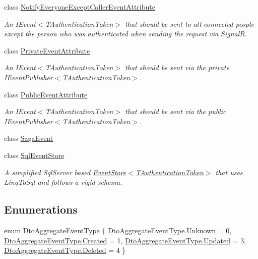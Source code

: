 \begin{DoxyCompactItemize}
class \hyperlink{classCqrs_1_1Events_1_1NotifyEveryoneExceptCallerEventAttribute}{Notify\+Everyone\+Except\+Caller\+Event\+Attribute}
\begin{DoxyCompactList}\small\item\em An I\+Event$<$\+T\+Authentication\+Token$>$ that should be sent to all connected people except the person who was authenticated when sending the request via SignalR. \end{DoxyCompactList}\item 
class \hyperlink{classCqrs_1_1Events_1_1PrivateEventAttribute}{Private\+Event\+Attribute}
\begin{DoxyCompactList}\small\item\em An I\+Event$<$\+T\+Authentication\+Token$>$ that should be sent via the private I\+Event\+Publisher$<$\+T\+Authentication\+Token$>$. \end{DoxyCompactList}\item 
class \hyperlink{classCqrs_1_1Events_1_1PublicEventAttribute}{Public\+Event\+Attribute}
\begin{DoxyCompactList}\small\item\em An I\+Event$<$\+T\+Authentication\+Token$>$ that should be sent via the public I\+Event\+Publisher$<$\+T\+Authentication\+Token$>$. \end{DoxyCompactList}\item 
class \hyperlink{classCqrs_1_1Events_1_1SagaEvent}{Saga\+Event}
\item 
class \hyperlink{classCqrs_1_1Events_1_1SqlEventStore}{Sql\+Event\+Store}
\begin{DoxyCompactList}\small\item\em A simplified Sql\+Server based \hyperlink{classCqrs_1_1Events_1_1EventStore_a6346cb2aea4c5b4e740dc6cfb15abab8_a6346cb2aea4c5b4e740dc6cfb15abab8}{Event\+Store$<$\+T\+Authentication\+Token$>$} that uses Linq\+To\+Sql and follows a rigid schema. \end{DoxyCompactList}\end{DoxyCompactItemize}
\subsection*{Enumerations}
\begin{DoxyCompactItemize}
\item 
enum \hyperlink{namespaceCqrs_1_1Events_a2a32e13adeac92f5a93966cd8ee2d39a_a2a32e13adeac92f5a93966cd8ee2d39a}{Dto\+Aggregate\+Event\+Type} \{ \hyperlink{namespaceCqrs_1_1Events_a2a32e13adeac92f5a93966cd8ee2d39a_a2a32e13adeac92f5a93966cd8ee2d39aa88183b946cc5f0e8c96b2e66e1c74a7e}{Dto\+Aggregate\+Event\+Type.\+Unknown} = 0, 
\hyperlink{namespaceCqrs_1_1Events_a2a32e13adeac92f5a93966cd8ee2d39a_a2a32e13adeac92f5a93966cd8ee2d39aa0eceeb45861f9585dd7a97a3e36f85c6}{Dto\+Aggregate\+Event\+Type.\+Created} = 1, 
\hyperlink{namespaceCqrs_1_1Events_a2a32e13adeac92f5a93966cd8ee2d39a_a2a32e13adeac92f5a93966cd8ee2d39aaff0a3b7f3daef040faf89a88fdac01b7}{Dto\+Aggregate\+Event\+Type.\+Updated} = 3, 
\hyperlink{namespaceCqrs_1_1Events_a2a32e13adeac92f5a93966cd8ee2d39a_a2a32e13adeac92f5a93966cd8ee2d39aa5fe6005bf6e415c950c011fb65f12b8f}{Dto\+Aggregate\+Event\+Type.\+Deleted} = 4
 \}
\end{DoxyCompactItemize}


